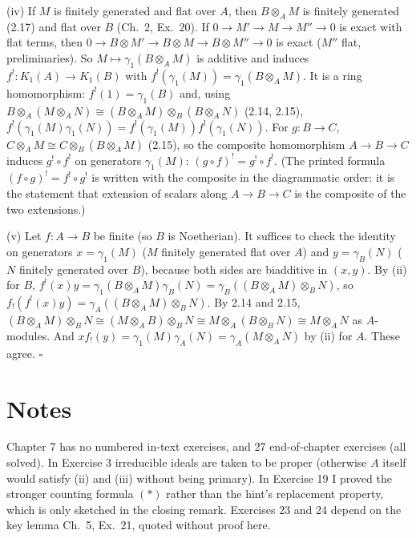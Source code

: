 \documentclass[11pt]{article}
\begin{document}
(iv) If $M$ is finitely generated and flat over $A$, then $B\otimes_AM$ is finitely generated (2.17) and flat over $B$ (Ch.~2, Ex.~20). If $0\to M'\to M\to M''\to0$ is exact with flat terms, then $0\to B\otimes M'\to B\otimes M\to B\otimes M''\to0$ is exact ($M''$ flat, preliminaries). So $M\mapsto\gamma_1(B\otimes_AM)$ is additive and induces $f^!:K_1(A)\to K_1(B)$ with $f^!(\gamma_1(M))=\gamma_1(B\otimes_AM)$. It is a ring homomorphism: $f^!(1)=\gamma_1(B)$ and, using $B\otimes_A(M\otimes_AN)\cong(B\otimes_AM)\otimes_B(B\otimes_AN)$ (2.14, 2.15), $f^!(\gamma_1(M)\gamma_1(N))=f^!(\gamma_1(M))f^!(\gamma_1(N))$. For $g:B\to C$, $C\otimes_AM\cong C\otimes_B(B\otimes_AM)$ (2.15), so the composite homomorphism $A\to B\to C$ induces $g^!\circ f^!$ on generators $\gamma_1(M)$: $(g\circ f)^!=g^!\circ f^!$. (The printed formula $(f\circ g)^!=f^!\circ g^!$ is written with the composite in the diagrammatic order: it is the statement that extension of scalars along $A\to B\to C$ is the composite of the two extensions.)

(v) Let $f:A\to B$ be finite (so $B$ is Noetherian). It suffices to check the identity on generators $x=\gamma_1(M)$ ($M$ finitely generated flat over $A$) and $y=\gamma_B(N)$ ($N$ finitely generated over $B$), because both sides are biadditive in $(x,y)$. By (ii) for $B$, $f^!(x)y=\gamma_1(B\otimes_AM)\gamma_B(N)=\gamma_B((B\otimes_AM)\otimes_BN)$, so $f_!(f^!(x)y)=\gamma_A((B\otimes_AM)\otimes_BN)$. By 2.14 and 2.15, $(B\otimes_AM)\otimes_BN\cong(M\otimes_AB)\otimes_BN\cong M\otimes_A(B\otimes_BN)\cong M\otimes_AN$ as $A$-modules. And $xf_!(y)=\gamma_1(M)\gamma_A(N)=\gamma_A(M\otimes_AN)$ by (ii) for $A$. These agree. \hfill$\square$

\section*{Notes}
Chapter 7 has no numbered in-text exercises, and 27 end-of-chapter exercises (all solved). In Exercise 3 irreducible ideals are taken to be proper (otherwise $A$ itself would satisfy (ii) and (iii) without being primary). In Exercise 19 I proved the stronger counting formula $(*)$ rather than the hint's replacement property, which is only sketched in the closing remark. Exercises 23 and 24 depend on the key lemma Ch.~5, Ex.~21, quoted without proof here.
\end{document}
